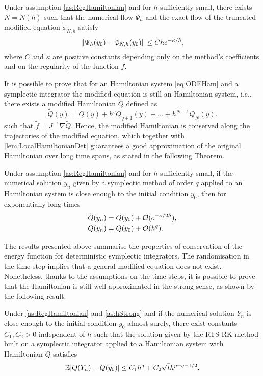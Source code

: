 \documentclass[final,onefignum,onetabnum]{siamonline171218}
\begin{document}
\begin{lemma}\label{lem:LocalHamiltonianDet} Under assumption \ref{as:RegHamiltonian} and for $h$ sufficiently small, there exists $N = N(h)$ such that the numerical flow $\Psi_h$ and the exact flow of the truncated modified equation $\tilde \phi_{N, h}$ satisfy
	\begin{equation}
	\lVert\Psi_h(y_0) - \tilde {\varphi}_{N, h}(y_0)\rVert \leq C h e^{-\kappa / h},
	\end{equation}
	where $C$ and $\kappa$ are positive constants depending only on the method's coefficients and on the regularity of the function $f$.
\end{lemma}
It is possible to prove that for an Hamiltonian system \eqref{eq:ODEHam} and a symplectic integrator the modified equation is still an Hamiltonian system, i.e., there exists a modified Hamiltonian $\tilde Q$ defined as
\begin{equation}\label{eq:ModifiedHamiltonianTrunc}
\tilde Q(y) = Q(y) + h^q Q_{q+1}(y) + \ldots + h^{N-1} Q_N(y).
\end{equation}
such that $\tilde f = J^{-1} \nabla \tilde Q$. Hence, the modified Hamiltonian is conserved along the trajectories of the modified equation, which together with \cref{lem:LocalHamiltonianDet} guarantees a good approximation of the original Hamiltonian over long time spans, as stated in the following Theorem.
\begin{theorem} Under assumption \ref{as:RegHamiltonian} and for $h$ sufficiently small, if the numerical solution $y_n$ given by a symplectic method of order $q$ applied to an Hamiltonian system is close enough to the initial condition $y_0$, then for exponentially long times
	\begin{align}
	\tilde Q(y_n) &= \tilde Q (y_0) + \mathcal{O}(e^{-\kappa / 2h}), \\
	Q(y_n) &= Q(y_0) + \mathcal{O}(h^q).
	\end{align}
\end{theorem}
The results presented above summarise the properties of conservation of the energy function for deterministic symplectic integrators. The randomisation in the time step implies that a general modified equation does not exist. Nonetheless, thanks to the assumptions on the time steps, it is possible to prove that the Hamiltonian is still well approximated in the strong sense, as shown by the following result.
\begin{theorem}\label{thm:RTSHamiltonian} Under \cref{as:RegHamiltonian} and \cref{as:hStrong} and if the numerical solution $Y_n$ is close enough to the initial condition $y_0$ almost surely, there exist constants $C_1, C_2 > 0$ independent of $h$ such that the solution given by the RTS-RK method built on a symplectic integrator applied to a Hamiltonian system with Hamiltonian $Q$ satisfies
	\begin{equation}
	\operatorname{\mathbb{E}} \lvert Q(Y_n) - Q(y_0)\rvert \leq C_1 h^q + C_2 \sqrt{t} h^{p+q-1/2}.
	\end{equation}
\end{theorem}
\end{document}
